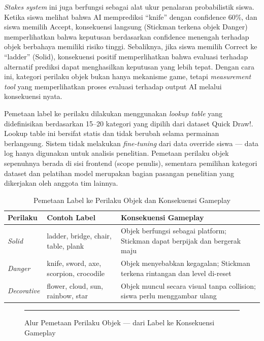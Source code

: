\documentclass[12pt,oneside]{report}
\begin{document}
\textit{Stakes system} ini juga berfungsi sebagai alat ukur penalaran probabilistik siswa. Ketika siswa melihat bahwa AI memprediksi ``knife'' dengan confidence 60\%, dan siswa memilih Accept, konsekuensi langsung (Stickman terkena objek Danger) memperlihatkan bahwa keputusan berdasarkan confidence menengah terhadap objek berbahaya memiliki risiko tinggi. Sebaliknya, jika siswa memilih Correct ke ``ladder'' (Solid), konsekuensi positif memperlihatkan bahwa evaluasi terhadap alternatif prediksi dapat menghasilkan keputusan yang lebih tepat. Dengan cara ini, kategori perilaku objek bukan hanya mekanisme game, tetapi \textit{measurement tool} yang memperlihatkan proses evaluasi terhadap output AI melalui konsekuensi nyata.

Pemetaan label ke perilaku dilakukan menggunakan \textit{lookup table} yang didefinisikan berdasarkan 15--20 kategori yang dipilih dari dataset Quick Draw!. Lookup table ini bersifat statis dan tidak berubah selama permainan berlangsung. Sistem tidak melakukan \textit{fine-tuning} dari data override siswa --- data log hanya digunakan untuk analisis penelitian. Pemetaan perilaku objek sepenuhnya berada di sisi frontend (scope penulis), sementara pemilihan kategori dataset dan pelatihan model merupakan bagian pasangan penelitian yang dikerjakan oleh anggota tim lainnya.

\begin{table}[H]
\centering
\caption{Pemetaan Label ke Perilaku Objek dan Konsekuensi Gameplay}
\label{tab:behavior-mapping}
\begin{tabular}{|l|l|p{6cm}|}
\hline
\textbf{Perilaku} & \textbf{Contoh Label} & \textbf{Konsekuensi Gameplay} \\ \hline
\textit{Solid} & ladder, bridge, chair, table, plank & Objek berfungsi sebagai platform; Stickman dapat berpijak dan bergerak maju \\ \hline
\textit{Danger} & knife, sword, axe, scorpion, crocodile & Objek menyebabkan kegagalan; Stickman terkena rintangan dan level di-reset \\ \hline
\textit{Decorative} & flower, cloud, sun, rainbow, star & Objek muncul secara visual tanpa collision; siswa perlu menggambar ulang \\ \hline
\end{tabular}
\end{table}

\begin{figure}[H]
    \centering
    \rule{0.9\textwidth}{6cm}
    \caption{Alur Pemetaan Perilaku Objek --- dari Label ke Konsekuensi Gameplay}
    \label{fig:mapping-perilaku}
\end{figure}
\end{document}
